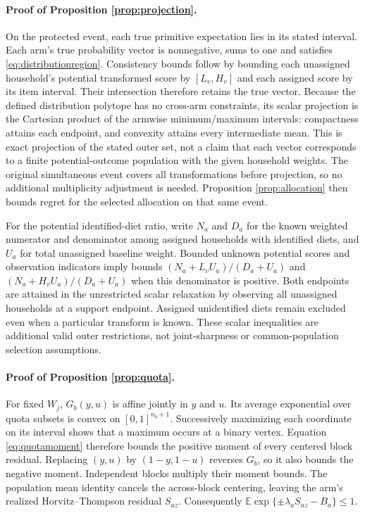 \documentclass[11pt]{article}
\newcommand{\E}{\mathbb{E}}
\begin{document}
\paragraph{Proof of Proposition \ref{prop:projection}.}
On the protected event, each true primitive expectation lies in its stated interval. Each arm's true probability vector is nonnegative, sums to one and satisfies \eqref{eq:distributionregion}. Consistency bounds follow by bounding each unassigned household's potential transformed score by $[L_v,H_v]$ and each assigned score by its item interval. Their intersection therefore retains the true vector. Because the defined distribution polytope has no cross-arm constraints, its scalar projection is the Cartesian product of the armwise minimum/maximum intervals: compactness attains each endpoint, and convexity attains every intermediate mean. This is exact projection of the stated outer set, not a claim that each vector corresponds to a finite potential-outcome population with the given household weights. The original simultaneous event covers all transformations before projection, so no additional multiplicity adjustment is needed. Proposition \ref{prop:allocation} then bounds regret for the selected allocation on that same event.

For the potential identified-diet ratio, write $N_a$ and $D_a$ for the known weighted numerator and denominator among assigned households with identified diets, and $U_a$ for total unassigned baseline weight. Bounded unknown potential scores and observation indicators imply bounds $(N_a+L_vU_a)/(D_a+U_a)$ and $(N_a+H_vU_a)/(D_a+U_a)$ when this denominator is positive. Both endpoints are attained in the unrestricted scalar relaxation by observing all unassigned households at a support endpoint. Assigned unidentified diets remain excluded even when a particular transform is known. These scalar inequalities are additional valid outer restrictions, not joint-sharpness or common-population selection assumptions.

\paragraph{Proof of Proposition \ref{prop:quota}.}
For fixed $W_j$, $G_b(y,u)$ is affine jointly in $y$ and $u$. Its average exponential over quota subsets is convex on $[0,1]^{n_b+1}$. Successively maximizing each coordinate on its interval shows that a maximum occurs at a binary vertex. Equation \eqref{eq:quotamoment} therefore bounds the positive moment of every centered block residual. Replacing $(y,u)$ by $(1-y,1-u)$ reverses $G_b$, so it also bounds the negative moment. Independent blocks multiply their moment bounds. The population mean identity cancels the across-block centering, leaving the arm's realized Horvitz--Thompson residual $S_{az}$. Consequently $\E\exp\{\pm\lambda_a S_{az}-B_a\}\leq1$.
\end{document}
